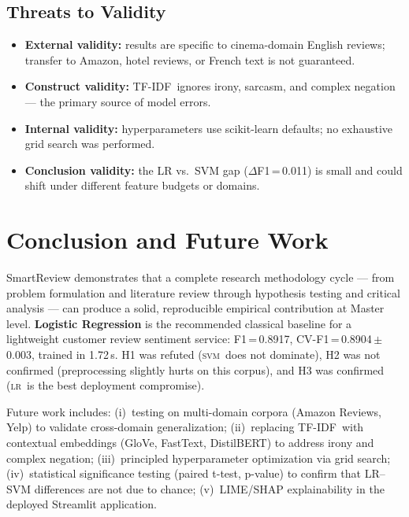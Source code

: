 \documentclass[conference]{IEEEtran}
\newcommand{\LR}{\textsc{lr}}
\newcommand{\SVM}{\textsc{svm}}
\newcommand{\TFIDF}{TF-IDF}
\begin{document}
\subsection{Threats to Validity}

\begin{itemize}
  \item \textbf{External validity:} results are specific to
        cinema-domain English reviews; transfer to Amazon,
        hotel reviews, or French text is not guaranteed.
  \item \textbf{Construct validity:} \TFIDF\ ignores irony,
        sarcasm, and complex negation --- the primary source of
        model errors.
  \item \textbf{Internal validity:} hyperparameters use
        scikit-learn defaults; no exhaustive grid search was
        performed.
  \item \textbf{Conclusion validity:} the LR vs.\ SVM gap
        ($\Delta$F1\,=\,0.011) is small and could shift under
        different feature budgets or domains.
\end{itemize}

\section{Conclusion and Future Work}

SmartReview demonstrates that a complete research methodology
cycle --- from problem formulation and literature review through
hypothesis testing and critical analysis --- can produce a solid,
reproducible empirical contribution at Master level.
\textbf{Logistic Regression} is the recommended classical
baseline for a lightweight customer review sentiment service:
F1\,=\,0.8917, CV-F1\,=\,0.8904\,$\pm$\,0.003, trained in 1.72\,s.
H1 was refuted (\SVM\ does not dominate), H2 was not confirmed
(preprocessing slightly hurts on this corpus), and H3 was
confirmed (\LR\ is the best deployment compromise).

Future work includes:
(i)~testing on multi-domain corpora (Amazon Reviews, Yelp) to
validate cross-domain generalization;
(ii)~replacing \TFIDF\ with contextual embeddings
(GloVe, FastText, DistilBERT) to address irony and complex negation;
(iii)~principled hyperparameter optimization via grid search;
(iv)~statistical significance testing (paired t-test, p-value)
to confirm that LR--SVM differences are not due to chance;
(v)~LIME/SHAP explainability in the deployed Streamlit application.
\end{document}
